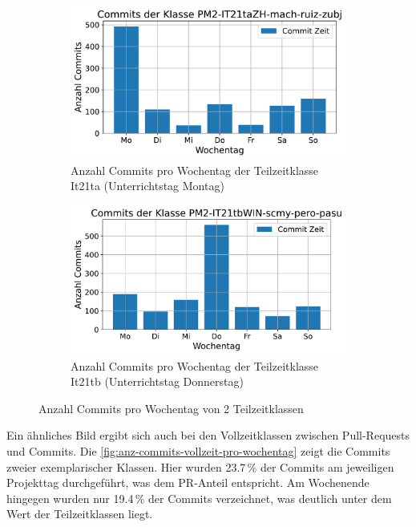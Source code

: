 \begin{figure}[htbp]
    \centering
    \begin{subfigure}[b]{0.48\textwidth}
        \centering
        \includegraphics[width=\textwidth]{Figures/commits-klasse-per-wochentag-21ta.pdf}
         \caption{Anzahl Commits pro Wochentag der Teilzeitklasse It21ta (Unterrichtstag Montag)}
        \label{fig:anzahl-commits-pro-wochentag-it21ta}
    \end{subfigure}
    \hfill
    \begin{subfigure}[b]{0.48\textwidth}
        \centering
        \includegraphics[width=\textwidth]{Figures/commits-klasse-per-wochentag-21tb.pdf}
         \caption{Anzahl Commits pro Wochentag der Teilzeitklasse It21tb (Unterrichtstag Donnerstag)}
        \label{fig:anzahl-commits-pro-wochentag-it21tb}
    \end{subfigure}
    \caption{Anzahl Commits pro Wochentag von 2 Teilzeitklassen}
    \label{fig:anz-commits-teilzeit-pro-wochentag}
\end{figure}

Ein ähnliches Bild ergibt sich auch bei den Vollzeitklassen zwischen Pull-Requests und Commits. Die \autoref{fig:anz-commits-vollzeit-pro-wochentag} zeigt die Commits zweier exemplarischer Klassen. Hier wurden 23.7\,\% der Commits am jeweiligen Projekttag durchgeführt, was dem PR-Anteil entspricht. Am Wochenende hingegen wurden nur 19.4\,\% der Commits verzeichnet, was deutlich unter dem Wert der Teilzeitklassen liegt.


